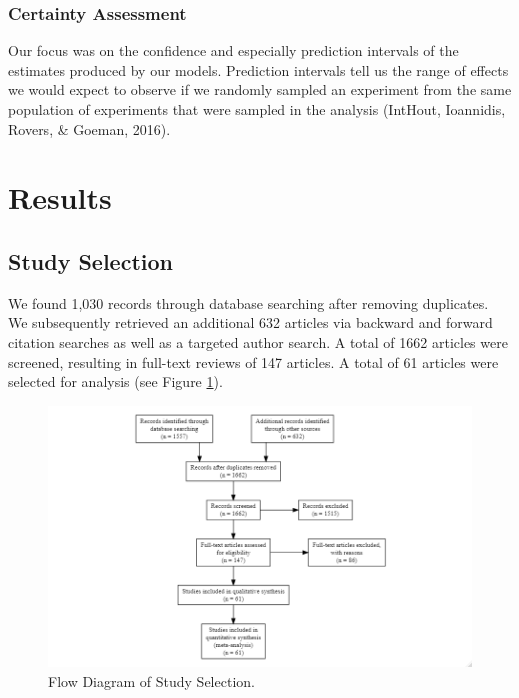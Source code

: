 \documentclass[
  english,
  man, donotrepeattitle,floatsintext]{apa7}
\begin{document}
\hypertarget{certainty-assessment}{%
\subsubsection{Certainty Assessment}\label{certainty-assessment}}

Our focus was on the confidence and especially prediction intervals of the estimates produced by our models. Prediction intervals tell us the range of effects we would expect to observe if we randomly sampled an experiment from the same population of experiments that were sampled in the analysis (IntHout, Ioannidis, Rovers, \& Goeman, 2016).

\hypertarget{results}{%
\section{Results}\label{results}}

\hypertarget{study-selection}{%
\subsection{Study Selection}\label{study-selection}}

We found 1,030 records through database searching after removing duplicates. We subsequently retrieved an additional 632 articles via backward and forward citation searches as well as a targeted author search. A total of 1662 articles were screened, resulting in full-text reviews of 147 articles. A total of 61 articles were selected for analysis (see Figure \ref{fig:fig1}).



\begin{figure}

{\centering \includegraphics[width=1.25\linewidth,height=1.5\textheight]{../../figures/fig1} 

}

\caption{Flow Diagram of Study Selection.}\label{fig:fig1}
\end{figure}
\end{document}
